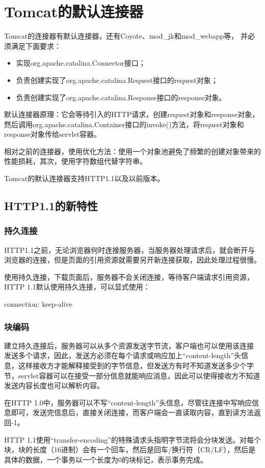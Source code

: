 \chapter{Tomcat的默认连接器}
Tomcat的连接器有默认连接器，还有Coyote、mod\_jk和mod\_webapp等，
并必须满足下面要求：
\begin{itemize}
	\item 实现org.apache.catalina.Connector接口；
	\item 负责创建实现了org.apache.catalina.Request接口的request对象；
	\item 负责创建实现了org.apache.catalina.Response接口的response对象。
\end{itemize}
\par 默认连接器原理：它会等待引入的HTTP请求，创建request对象和response对象，然后调用org.apache.catalina.Container接口的invoke()方法，将request对象和response对象传给servlet容器。
\par 相对之前的连接器，使用优化方法：使用一个对象池避免了频繁的创建对象带来的性能损耗，其次，使用字符数组代替字符串。
\par Tomcat的默认连接器支持HTTP1.1以及以前版本。
\section{HTTP1.1的新特性}
\subsection{持久连接}
HTTP1.1之前，无论浏览器何时连接服务器，当服务器处理请求后，就会断开与浏览器的连接，但是页面的引用资源就需要另开新连接获取，因此处理过程很慢。
\par 使用持久连接，下载页面后，服务器不会关闭连接，等待客户端请求引用资源，HTTP 1.1默认使用持久连接，可以显式使用：
\par connection: keep-alive
\subsection{块编码}
建立持久连接后，服务器可以从多个资源发送字节流，客户端也可以使用该连接
发送多个请求，因此，发送方必须在每个请求或响应加上“content-length”头信息，这样接收方才能解释接受到的字节信息，但发送方有时不知道发送多少个字节，servlet容器可以在接受一部分信息就能响应消息，因此可以使得接收方不知道发送内容长度也可以解析内容。
\par 在HTTP 1.0中，服务器可以不写“content-length”头信息，尽管往连接中写响应信息即可，发送完信息后，直接关闭连接，而客户端会一直读取内容，直到读方法返回-1。
\par HTTP 1.1使用“transfer-encoding”的特殊请求头指明字节流将会分块发送。对每个块，块的长度（16进制）会有一个回车，然后是回车/换行符（CR/LF），然后是具体的数据，一个事务以一个长度为0的块标记，表示事务完成。
